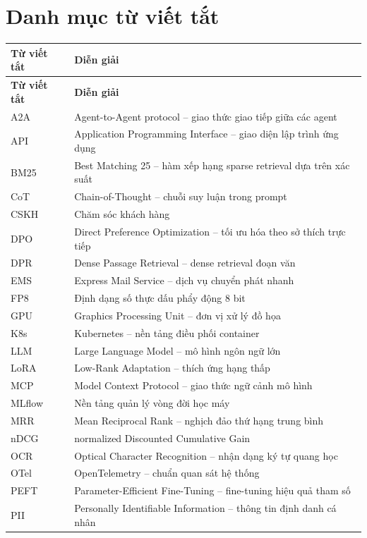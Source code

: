 \chapter*{Danh mục từ viết tắt}
\begin{longtable}{@{}p{3.2cm}p{11.5cm}@{}}
\toprule
\textbf{Từ viết tắt} & \textbf{Diễn giải} \\
\midrule
\endfirsthead
\toprule
\textbf{Từ viết tắt} & \textbf{Diễn giải} \\
\midrule
\endhead
\bottomrule
\endfoot
A2A & Agent-to-Agent protocol -- giao thức giao tiếp giữa các agent \\
API & Application Programming Interface -- giao diện lập trình ứng dụng \\
BM25 & Best Matching 25 -- hàm xếp hạng sparse retrieval dựa trên xác suất \\
CoT & Chain-of-Thought -- chuỗi suy luận trong prompt \\
CSKH & Chăm sóc khách hàng \\
DPO & Direct Preference Optimization -- tối ưu hóa theo sở thích trực tiếp \\
DPR & Dense Passage Retrieval -- dense retrieval đoạn văn \\
EMS & Express Mail Service -- dịch vụ chuyển phát nhanh \\
FP8 & Định dạng số thực dấu phẩy động 8 bit \\
GPU & Graphics Processing Unit -- đơn vị xử lý đồ họa \\
K8s & Kubernetes -- nền tảng điều phối container \\
LLM & Large Language Model -- mô hình ngôn ngữ lớn \\
LoRA & Low-Rank Adaptation -- thích ứng hạng thấp \\
MCP & Model Context Protocol -- giao thức ngữ cảnh mô hình \\
MLflow & Nền tảng quản lý vòng đời học máy \\
MRR & Mean Reciprocal Rank -- nghịch đảo thứ hạng trung bình \\
nDCG & normalized Discounted Cumulative Gain \\
OCR & Optical Character Recognition -- nhận dạng ký tự quang học \\
OTel & OpenTelemetry -- chuẩn quan sát hệ thống \\
PEFT & Parameter-Efficient Fine-Tuning -- fine-tuning hiệu quả tham số \\
PII & Personally Identifiable Information -- thông tin định danh cá nhân \\

\end{longtable}
